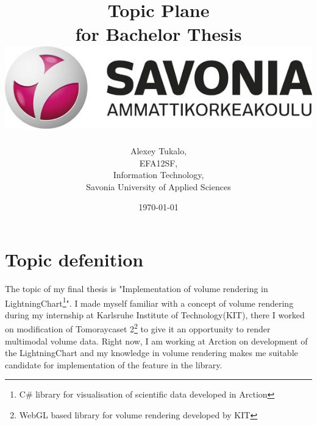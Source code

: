 \documentclass[english]{article}
\date{}
\begin{document}
\title{\vspace{2in}Topic Plane\\
\small for Bachelor Thesis\\
\vspace{0.5in}\includegraphics{savonia.jpg}}

\nopagebreak
\maketitle


\vspace{3in}

\author{
\begin{flushright}
Alexey Tukalo,\\
EFA12SF,\\
Information Technology,\\
Savonia University of Applied Sciences
\end{flushright}
}

\date{\today}
\thispagestyle{empty}

\newpage
\setcounter{page}{1}
\setcounter{tocdepth}{2}




\section{Topic defenition}

The topic of my final thesis is "Implementation of volume rendering in LightningChart\footnote{C\# library for visualisation of scientific data developed in Arction}". I made myself familiar with a concept of volume rendering during my internship at Karlsruhe Institute of Technology(KIT), there I worked on modification of Tomoraycaset 2\footnote{WebGL based library for volume rendering developed by KIT} to give it an opportunity to render multimodal volume data. Right now, I am working at Arction on development of the LightningChart and my knowledge in volume rendering makes me suitable candidate for implementation of the feature in the library.\\
\end{document}
